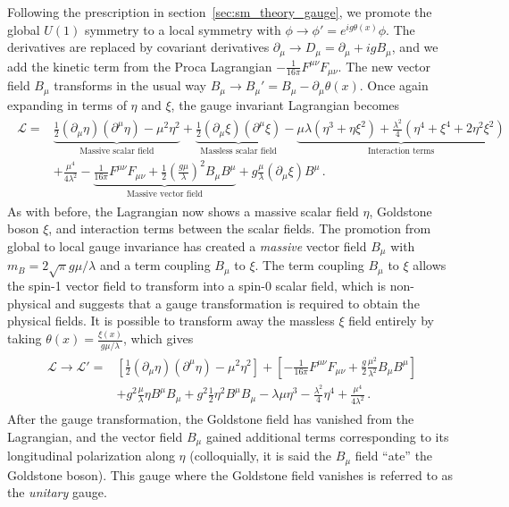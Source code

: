 Following the prescription in section~\ref{sec:sm_theory_gauge}, we promote the global $U(1)$ symmetry to a local symmetry with $\phi\to\phi'=e^{ig\theta(x)}\phi$. The derivatives are replaced by covariant derivatives $\partial_\mu\to D_\mu=\partial_\mu+igB_\mu$, and we add the kinetic term from the Proca Lagrangian $-\frac{1}{16\pi}F^{\mu\nu}F_{\mu\nu}$. The new vector field $B_\mu$ transforms in the usual way $B_\mu\to B_\mu'=B_\mu-\partial_\mu\theta(x)$. Once again expanding in terms of $\eta$ and $\xi$, the gauge invariant Lagrangian becomes
\begin{align}
	\begin{split}
		\mathcal{L}=&\underbrace{\frac{1}{2}(\partial_\mu\eta)(\partial^\mu\eta)-\mu^2\eta^2}_\text{Massive scalar field}+\underbrace{\frac{1}{2}(\partial_\mu\xi)(\partial^\mu\xi)}_\text{Massless scalar field}-\underbrace{\mu\lambda(\eta^3+\eta\xi^2)+\frac{\lambda^2}{4}(\eta^4+\xi^4+2\eta^2\xi^2)}_\text{Interaction terms}\\
		&+\frac{\mu^4}{4\lambda^2}-\underbrace{\frac{1}{16\pi}F^{\mu\nu}F_{\mu\nu}+\frac{1}{2}\left(\frac{g\mu}{\lambda}\right)^2B_\mu B^\mu}_\text{Massive vector field}+g\frac{\mu}{\lambda}(\partial_\mu\xi)B^\mu\,.
	\end{split}
\end{align}
As with before, the Lagrangian now shows a massive scalar field $\eta$, Goldstone boson $\xi$, and interaction terms between the scalar fields. The promotion from global to local gauge invariance has created a \textit{massive} vector field $B_\mu$ with $m_B=2\sqrt{\pi}g\mu/\lambda$ and a term coupling $B_\mu$ to $\xi$. The term coupling $B_\mu$ to $\xi$ allows the spin-1 vector field to transform into a spin-0 scalar field, which is non-physical and suggests that a gauge transformation is required to obtain the physical fields. It is possible to transform away the massless $\xi$ field entirely by taking $\theta(x)=\frac{\xi(x)}{g\mu/\lambda}$, which gives
\begin{align}
	\begin{split}
		\mathcal{L}\to\mathcal{L'}=&\left[\frac{1}{2}(\partial_\mu\eta)(\partial^\mu\eta)-\mu^2\eta^2\right]+\left[-\frac{1}{16\pi}F^{\mu\nu}F_{\mu\nu}+\frac{g}{2}\frac{\mu^2}{\lambda^2}B_\mu B^\mu\right]\\
		&+g^2\frac{\mu}{\lambda}\eta B^\mu B_\mu+g^2\frac{1}{2}\eta^2B^\mu B_\mu-\lambda\mu\eta^3-\frac{\lambda^2}{4}\eta^4+\frac{\mu^4}{4\lambda^2}\,.
	\end{split}
\end{align}
After the gauge transformation, the Goldstone field has vanished from the Lagrangian, and the vector field $B_\mu$ gained additional terms corresponding to its longitudinal polarization along $\eta$ (colloquially, it is said the $B_\mu$ field ``ate'' the Goldstone boson). This gauge where the Goldstone field vanishes is referred to as the \textit{unitary} gauge.


